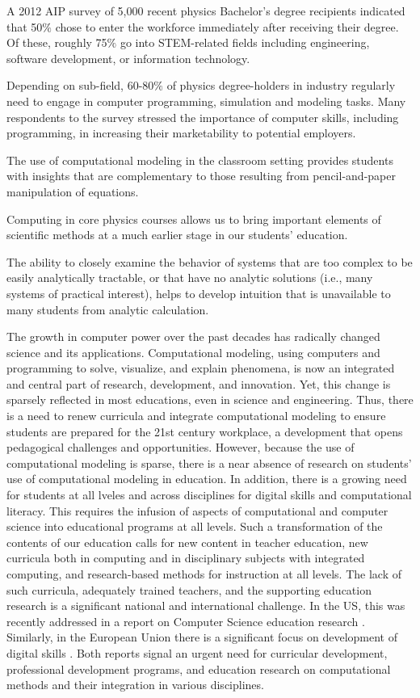 \documentclass[reprint,floatfix]{revtex4-1}
\begin{document}
A 2012 AIP survey \cite{AIPsurvery2012} of 5,000 recent physics Bachelor’s degree recipients
indicated that 50$\%$ chose to enter the workforce immediately after
receiving their degree.  Of these, roughly 75$\%$ go into STEM-related
fields including engineering, software development, or information
technology.

Depending on sub-field, 60-80$\%$ of physics degree-holders in
industry regularly need to engage in computer programming, simulation
and modeling tasks.  Many respondents to the survey stressed the
importance of computer skills, including programming, in increasing
their marketability to potential employers.


The use of computational modeling in the classroom setting provides
students with insights that are complementary to those resulting from
pencil-and-paper manipulation of equations.

Computing in core physics courses allows us to bring important
elements of scientific methods at a much earlier stage in our
students' education.


The ability to closely examine the behavior of systems that are too
complex to be easily analytically tractable, or that have no analytic
solutions (i.e., many systems of practical interest), helps to develop
intuition that is unavailable to many students from analytic
calculation.

The growth in computer power over the past decades has radically
changed science and its applications. Computational modeling, using
computers and programming to solve, visualize, and explain phenomena, 
is now an integrated and central part of research, development, and
innovation. Yet, this change is sparsely reflected in most educations,
even in science and engineering. Thus, there is a need to renew
curricula and integrate computational modeling to ensure students are
prepared for the 21st century workplace, a development that opens
pedagogical challenges and opportunities. However, because the use of
computational modeling is sparse, there is a near absence of research
on students’ use of computational modeling in education. In addition,
there is a growing need for students at all lveles and across disciplines for
digital skills and computational literacy. This requires the infusion
of aspects of computational and computer science into educational
programs at all levels. Such a transformation of the contents of our
education calls for new content in teacher education, new curricula
both in computing and in disciplinary subjects with integrated
computing, and research-based methods for instruction at all
levels. The lack of such curricula, adequately trained teachers, and
the supporting education research is a significant national and
international challenge. In the US, this was recently addressed in a
report on Computer Science education research \cite{USreport}. Similarly, in the
European Union there is a significant focus on development of digital skills
\cite{EUreport}.  Both reports signal an urgent
need for curricular development, professional development programs,
and education research on computational methods and their integration
in various disciplines.






\end{document}
